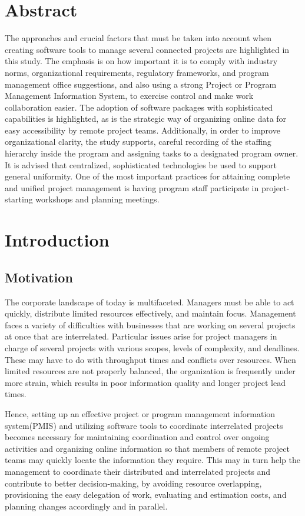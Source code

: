 \documentclass{llncs}
\begin{document}
\section{Abstract}
The approaches and crucial factors that must be taken into account when creating software tools to manage several connected projects are highlighted in this study. The emphasis is on how important it is to comply with industry norms, organizational requirements, regulatory frameworks, and program management office suggestions, and also using a strong Project or Program Management Information System, to exercise control and make work collaboration easier. The adoption of software packages with sophisticated capabilities is highlighted, as is the strategic way of organizing online data for easy accessibility by remote project teams. Additionally, in order to improve organizational clarity, the study supports, careful recording of the staffing hierarchy inside the program and assigning tasks to a designated program owner. It is advised that centralized, sophisticated technologies be used to support general uniformity. One of the most important practices for attaining complete and unified project management is having program staff participate in project-starting workshops and planning meetings.



\tableofcontents
\newpage

\section{Introduction}

\subsection{Motivation}
The corporate landscape of today is multifaceted. Managers must be able to act quickly, distribute limited resources effectively, and maintain focus. Management faces a variety of difficulties with businesses that are working on several projects at once that are interrelated. Particular issues arise for project managers in charge of several projects with various scopes, levels of complexity, and deadlines. These may have to do with throughput times and conflicts over resources. When limited resources are not properly balanced, the organization is frequently under more strain, which results in poor information quality and longer project lead times.~\cite{refpaper1}

Hence, setting up an effective project or program management information system(PMIS) and utilizing software tools to coordinate interrelated projects becomes necessary for maintaining coordination and control over ongoing activities and organizing online information so that members of remote project teams may quickly locate the information they require. This may in turn help the management to coordinate their distributed and interrelated projects and contribute to better decision-making, by avoiding resource overlapping, provisioning the easy delegation of work, evaluating and estimation costs, and planning changes accordingly and in parallel.~\cite{refpaper1}
\end{document}
